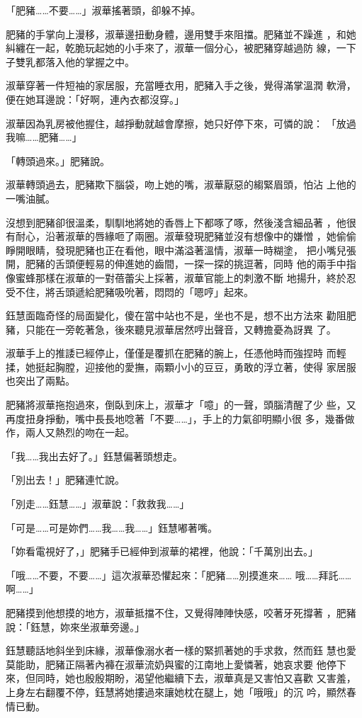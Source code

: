 「肥豬……不要……」淑華搖著頭，卻躲不掉。

肥豬的手掌向上漫移，淑華邊扭動身體，邊用雙手來阻擋。肥豬並不躁進
，和她糾纏在一起，乾脆玩起她的小手來了，淑華一個分心，被肥豬穿越過防
線，一下子雙乳都落入他的掌握之中。

淑華穿著一件短袖的家居服，充當睡衣用，肥豬入手之後，覺得滿掌溫潤
軟滑，便在她耳邊說：「好啊，連內衣都沒穿。」

淑華因為乳房被他握住，越掙動就越會摩擦，她只好停下來，可憐的說：
「放過我嘛……肥豬……」

「轉頭過來。」肥豬說。

淑華轉頭過去，肥豬欺下腦袋，吻上她的嘴，淑華厭惡的縐緊眉頭，怕沾
上他的一嘴油膩。

沒想到肥豬卻很溫柔，馴馴地將她的香唇上下都啄了啄，然後淺含細品著
，他很有耐心，沿著淑華的唇緣咂了兩圈。淑華發現肥豬並沒有想像中的嫌憎
，她偷偷睜開眼睛，發現肥豬也正在看他，眼中滿溢著溫情，淑華一時糊塗，
把小嘴兒張開，肥豬的舌頭便輕易的伸進她的齒間，一探一探的挑逗著，同時
他的兩手中指像蜜蜂那樣在淑華的一對蓓蕾尖上採著，淑華官能上的刺激不斷
地揚升，終於忍受不住，將舌頭遞給肥豬吸吮著，悶悶的「嗯哼」起來。

鈺慧面臨奇怪的局面變化，傻在當中站也不是，坐也不是，想不出方法來
勸阻肥豬，只能在一旁乾著急，後來聽見淑華居然哼出聲音，又轉擔憂為訝異
了。

淑華手上的推諉已經停止，僅僅是覆抓在肥豬的腕上，任憑他時而強捏時
而輕揉，她挺起胸膛，迎接他的愛撫，兩顆小小的豆豆，勇敢的浮立著，使得
家居服也突出了兩點。

肥豬將淑華拖抱過來，倒臥到床上，淑華才「噫」的一聲，頭腦清醒了少
些，又再度扭身掙動，嘴中長長地唸著「不要……」，手上的力氣卻明顯小很
多，幾番做作，兩人又熱烈的吻在一起。

「我……我出去好了。」鈺慧偏著頭想走。

「別出去！」肥豬連忙說。

「別走……鈺慧……」淑華說：「救救我……」

「可是……可是妳們……我……我……」鈺慧嘟著嘴。

「妳看電視好了，」肥豬手已經伸到淑華的裙裡，他說：「千萬別出去。」

「哦……不要，不要……」這次淑華恐懼起來：「肥豬……別摸進來……
哦……拜託……啊……」

肥豬摸到他想摸的地方，淑華抵擋不住，又覺得陣陣快感，咬著牙死撐著
，肥豬說：「鈺慧，妳來坐淑華旁邊。」

鈺慧聽話地斜坐到床緣，淑華像溺水者一樣的緊抓著她的手求救，然而鈺
慧也愛莫能助，肥豬正隔著內褲在淑華流奶與蜜的江南地上愛憐著，她哀求要
他停下來，但同時，她也殷殷期盼，渴望他繼續下去，淑華真是又害怕又喜歡
又害羞，上身左右翻覆不停，鈺慧將她摟過來讓她枕在腿上，她「哦哦」的沉
吟，顯然春情已動。

